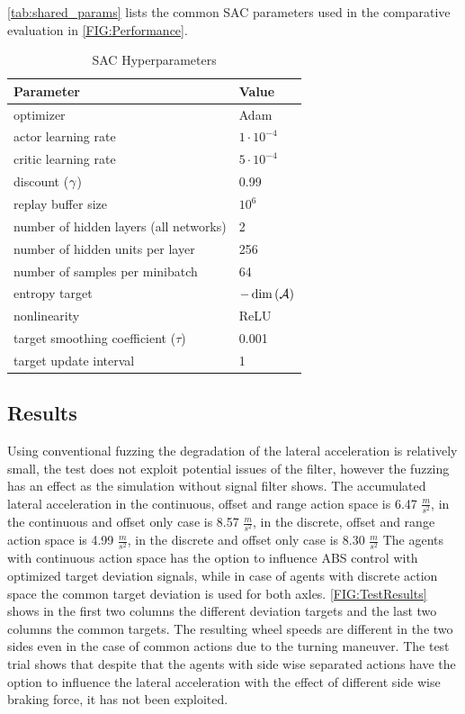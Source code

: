 \documentclass[a4paper, fleqn]{template/cas-dc}
\begin{document}
	\autoref{tab:shared_params} lists the common SAC parameters used in the comparative evaluation in \autoref{FIG:Performance}.
	
	\begin{table}[hb]
		\renewcommand{\arraystretch}{1.1}
		\centering		
		\vspace{1mm}
		\begin{tabular}{l| l }
			\toprule
			Parameter &  Value\\
			\midrule
			optimizer &Adam\\
			actor learning rate & $1 \cdot 10^{-4}$\\
			critic learning rate & $5 \cdot 10^{-4}$\\
			discount ($\gamma$) &  0.99\\
			replay buffer size & $10^6$\\
			number of hidden layers (all networks) & 2\\
			number of hidden units per layer & 256\\
			number of samples per minibatch & 64\\
			entropy target & $-\dim\left(\mathcal{A}\right)$ \\
			nonlinearity & ReLU\\
			target smoothing coefficient ($\tau$)& 0.001\\
			target update interval & 1\\			
			\bottomrule
		\end{tabular}
		\caption{SAC Hyperparameters}
		\label{tab:shared_params}
	\end{table}
	
	\subsection{Results}
	Using conventional fuzzing the degradation of the lateral acceleration is relatively small, the test does not exploit potential issues of the filter, however the fuzzing has an effect as the simulation without signal filter shows. The accumulated lateral acceleration in the continuous, offset and range action space is 6.47 $\frac{m}{s^2}$, in the continuous and offset only case is 8.57 $\frac{m}{s^2}$, in the discrete, offset and range action space is 4.99 $\frac{m}{s^2}$, in the discrete and offset only case is 8.30 $\frac{m}{s^2}$ 
	The agents with continuous action space has the option to influence ABS control with optimized target deviation signals, while in case of agents with discrete action space the common target deviation is used for both axles. \autoref{FIG:TestResults} shows in the first two columns the different deviation targets and the last two columns the common targets. The resulting wheel speeds are different in the two sides even in the case of common actions due to the turning maneuver. The test trial shows that despite that the agents with side wise separated actions have the option to influence the lateral acceleration with the effect of different side wise braking force, it has not been exploited.
	
\end{document}
